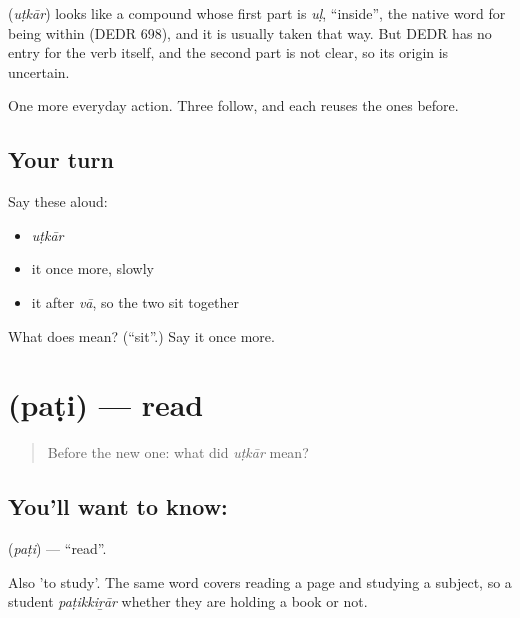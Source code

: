 \begin{cousinweb}
\textbf{} (\emph{uṭkār}) looks like a compound whose first part is \emph{uḷ}, \textquotedblleft{}inside\textquotedblright{}, the native word for being within (DEDR 698), and it is usually taken that way. But DEDR has no entry for the verb itself, and the second part is not clear, so its origin is uncertain.
\end{cousinweb}

\begin{grammarlens}[title={What you've built}]
One more everyday action. Three follow, and each reuses the ones before.
\end{grammarlens}

\subsection*{Your turn}
Say these aloud:

\begin{itemize}
\raggedright
  \item \emph{uṭkār}
  \item it once more, slowly
  \item it after \emph{vā}, so the two sit together
\end{itemize}

\begin{tcolorbox}[breakable,colback=teal!4,colframe=teal!35!black,title={Before you move on}]
What does  mean? (\textquotedblleft{}sit\textquotedblright{}.) Say it once more.
\end{tcolorbox}
\section[\texorpdfstring{\ta{படி} (paṭi)}{படி (paṭi)}]{ (paṭi) — read}

\label{lesson:TA-C42-read}



\begin{quote}
Before the new one: what did \emph{uṭkār} mean?
\end{quote}

\subsection*{You'll want to know: }
\textbf{} (\emph{paṭi}) — \textquotedblleft{}read\textquotedblright{}.

Also 'to study'. The same word covers reading a page and studying a subject, so a student \emph{paṭikkiṟār} whether they are holding a book or not.

